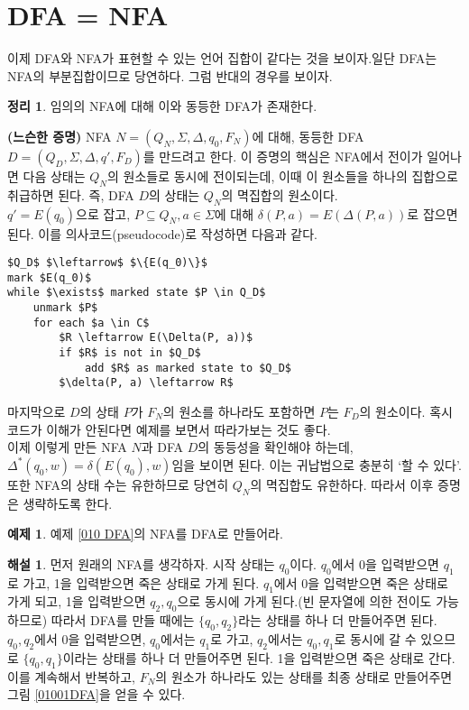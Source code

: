 \documentclass[b5paper, 11pt]{book}
\theoremstyle{definition}
\newtheorem{thm}[defn]{정리}
\newtheorem{ex}[defn]{예제}
\newtheorem*{ans*}{해설}
\newenvironment{pf*}{\pushQED{\qed}\pf}
{\popQED\endpf}
\begin{document}
\section{DFA = NFA}
이제 DFA와 NFA가 표현할 수 있는 언어 집합이 같다는 것을 보이자.일단 DFA는 NFA의 부분집합이므로 당연하다. 그럼 반대의 경우를 보이자.
\begin{thm} \label{dfa nfa equiv}
    임의의 NFA에 대해 이와 동등한 DFA가 존재한다.
\end{thm}
\begin{pf*}
\textbf{(느슨한 증명)}
NFA $N = (Q_N, \Sigma, \Delta, q_0, F_N)$에 대해, 동등한 DFA $D = ( Q_D, \Sigma, \Delta, q', F_D)$를 만드려고 한다. 이 증명의 핵심은 NFA에서 전이가 일어나면 다음 상태는 $Q_N$의 원소들로 동시에 전이되는데, 이때 이 원소들을 하나의 집합으로 취급하면 된다. 즉, DFA $D$의 상태는 $Q_N$의 멱집합의 원소이다. \\
$q' = E(q_0)$으로 잡고, $P \subseteq Q_N, a \in \Sigma$에 대해 $\delta(P, a) = E( \Delta(P, a) )$로 잡으면 된다. 이를 의사코드(pseudocode)로 작성하면 다음과 같다.
\begin{lstlisting}
$Q_D$ $\leftarrow$ $\{E(q_0)\}$
mark $E(q_0)$
while $\exists$ marked state $P \in Q_D$
    unmark $P$
    for each $a \in C$
        $R \leftarrow E(\Delta(P, a))$
        if $R$ is not in $Q_D$
            add $R$ as marked state to $Q_D$ 
        $\delta(P, a) \leftarrow R$
\end{lstlisting}
마지막으로 $D$의 상태 $P$가 $F_N$의 원소를 하나라도 포함하면 $P$는 $F_D$의 원소이다. 혹시 코드가 이해가 안된다면 예제를 보면서 따라가보는 것도 좋다. \\ 
이제 이렇게 만든 NFA $N$과 DFA $D$의 동등성을 확인해야 하는데, $\Delta^*(q_0, w) = \delta(E(q_0), w)$임을 보이면 된다. 이는 귀납법으로 충분히 `할 수 있다'. 또한 NFA의 상태 수는 유한하므로 당연히 $Q_N$의 멱집합도 유한하다. 따라서 이후 증명은 생략하도록 한다. 
\end{pf*}
\begin{ex}
    예제 \ref{010 DFA}의 NFA를 DFA로 만들어라. 
\end{ex} 
\begin{ans*}
    먼저 원래의 NFA를 생각하자. 시작 상태는 $q_0$이다. $q_0$에서 0을 입력받으면 $q_1$로 가고, 1을 입력받으면 죽은 상태로 가게 된다. $q_1$에서 0을 입력받으면 죽은 상태로 가게 되고, 1을 입력받으면 $q_2, q_0$으로 동시에 가게 된다.(빈 문자열에 의한 전이도 가능하므로) 따라서 DFA를 만들 때에는 $\{q_0, q_2\}$라는 상태를 하나 더 만들어주면 된다. ${q_0, q_2}$에서 0을 입력받으면, $q_0$에서는 $q_1$로 가고, $q_2$에서는 ${q_0, q_1}$로 동시에 갈 수 있으므로 $\{q_0, q_1\}$이라는 상태를 하나 더 만들어주면 된다. 1을 입력받으면 죽은 상태로 간다. 이를 계속해서 반복하고, $F_N$의 원소가 하나라도 있는 상태를 최종 상태로 만들어주면 그림 \ref{01001DFA}을 얻을 수 있다.
\end{ans*}
\end{document}
